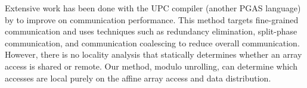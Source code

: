 Extensive work has been done with the UPC compiler (another PGAS language) by \cite{chen2005communication} to improve on communication performance. This method targets fine-grained communication and uses techniques such as redundancy elimination, split-phase communication, and communication coalescing to reduce overall communication. However, there is no locality analysis that statically determines whether an array access is shared or remote. Our method, modulo unrolling, can determine which accesses are local purely on the affine array access and data distribution. 

\begin{comment}
\cite{callahan1988compiling}
\cite{chamberlain1998zpl}
\cite{chamberlain1997factor}
\cite{chavarria2005effective}
\cite{davidson1995improving}
\cite{Dion96compilingaffine}
\cite{germain1995automatic}
\cite{Gupta91automaticdata}
\cite{gupta1996compiling}
\cite{huang1994speculative}
\cite{iancu2008performance}
\cite{li1991data}
\cite{pouchet2011loop}
\cite{ramanujam1991compile}
\cite{shih2000efficient}
\cite{trifunovic2010graphite}
\cite{wei1998compiling}
\cite{chamberlain2011user}
\cite{bonachea2007proposal}
\cite{sanz2012global}
\end{comment}